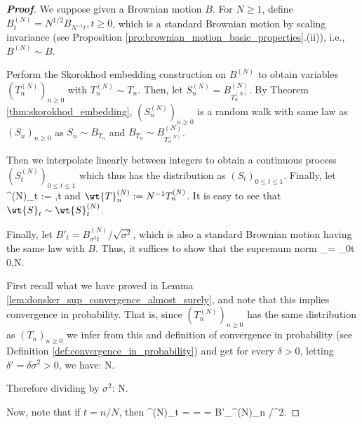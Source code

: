 \begin{proof}[\bf Proof]
We suppose given a Brownian motion $B$. For $N \geq 1$, define $B^{(N)}_t = N^{1/2}B_{N^{-1}t}, t \geq 0$, which is a standard Brownian motion by scaling invariance (see Proposition \ref{pro:brownian_motion_basic_properties}.(ii)), i.e., $B^{(N)} \sim B$.

Perform the Skorokhod embedding construction on $B^{(N)}$ to obtain variables $(T^{(N)}_n)_{ n \geq 0}$ with $T^{(N)}_n \sim T_n$. Then, let $S^{(N)}_n = B^{(N)}_{T^{(N)}_n}$. By Theorem \ref{thm:skorokhod_embedding}, $(S^{(N)}_n)_{ n \geq 0}$ is a random walk with same law as $(S_n)_{n \geq 0}$ as $S_n \sim B_{T_n}$ and $B_{T_n} \sim B^{(N)}_{T_n^{(N)}}$.

Then we interpolate linearly between integers to obtain a continuous process $(S^{(N)}_t )_{0 \leq t \leq 1}$ which thus has the distribution as $(S_t)_{0 \leq t \leq 1}$. Finally, let
\be
{}^{(N)}_t := ,\qquad t 
\ee
and $\wt{T}^{(N)}_n := N^{-1}T^{(N)}_n$. It is easy to see that $\wt{S}_t\sim \wt{S}_t^{(N)}$.

Finally, let $B'_t = B^{(N)}_{\sigma^2t}/\sqrt{\sigma^2}$, which is also a standard Brownian motion having the same law with $B$. Thus, it suffices to show that the supremum norm
\be
{}_\infty = \sup_{0\leq t}  0,\qquad {}N\to\infty.
\ee

First recall what we have proved in Lemma \ref{lem:donsker_sup_convergence_almost_surely}, and note that this implies convergence in probability. That is, since $(T^{(N)}_n)_{n \geq 0}$ has the same distribution as $(T_n)_{ n \geq 0}$ we infer from this and definition of convergence in probability (see Definition \ref{def:convergence_in_probability}) and get for every $\delta > 0$, letting $\delta' = \delta \sigma^2 > 0$, we have:
\be
\pro{} \quad{}N\to \infty.
\ee

Therefore dividing by $\sigma^2$:
\be
\pro{} \quad{}N\to \infty.
\ee

Now, note that if $t = n/N$, then
\be
{}^{(N)}_t =  =   =  B'_{^{(N)}_n /\sigma^2}.
\ee


\end{proof}
